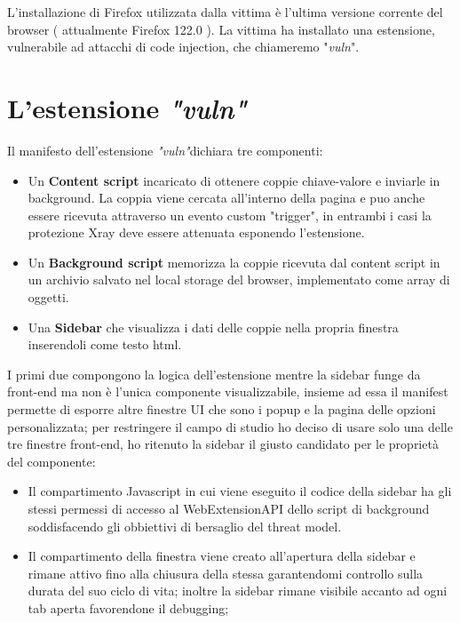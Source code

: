 \documentclass[]{sapthesis}
\newcommand{\vuln}{\textit{"vuln"}}
\begin{document}
        L'installazione di Firefox utilizzata dalla vittima è l'ultima versione corrente
        del browser ( attualmente Firefox 122.0 ). La vittima ha installato una estensione,
        vulnerabile ad attacchi di code injection, che chiameremo "\textit{vuln}".


    \section{L'estensione \vuln}

        Il manifesto dell'estensione \vuln dichiara tre componenti:
        \begin{itemize}
            \item Un \textbf{Content script} incaricato di ottenere coppie chiave-valore
                e inviarle in background. La coppia viene cercata all'interno della pagina
                e puo anche essere ricevuta attraverso un evento custom "trigger", in
                entrambi i casi la protezione Xray deve essere attenuata esponendo l'estensione.

            \item Un \textbf{Background script} memorizza la coppie ricevuta dal content script 
                in un archivio salvato nel local storage del browser, implementato
                come array di oggetti.

            \item Una \textbf{Sidebar} che visualizza i dati delle coppie nella propria finestra
                inserendoli come testo html.
        \end{itemize}

        I primi due compongono la logica dell'estensione mentre la sidebar funge da front-end ma
        non è l'unica componente visualizzabile, insieme ad essa il manifest permette
        di esporre altre finestre UI che sono i popup e la pagina delle opzioni personalizzata; per
        restringere il campo di studio ho deciso di usare solo una delle tre finestre front-end,
        ho ritenuto la sidebar il giusto candidato per le proprietà del componente:
        \begin{itemize}
            \item Il compartimento Javascript in cui viene eseguito il codice della sidebar
                ha gli stessi permessi di accesso al WebExtensionAPI dello script di background
                soddisfacendo gli obbiettivi di bersaglio del threat model.
            
            \item Il compartimento della finestra viene creato all'apertura della sidebar e rimane
                attivo fino alla chiusura della stessa garantendomi controllo sulla durata
                del suo ciclo di vita; inoltre la sidebar rimane visibile accanto ad ogni tab aperta
                favorendone il debugging;
                
        \end{itemize}
\end{document}
